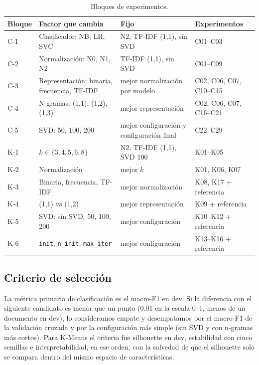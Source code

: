 \documentclass[11pt,a4paper]{article}
\newcommand{\code}[1]{\texttt{#1}}
\begin{document}
\begin{table}[htbp]
\centering
\footnotesize
\caption{Bloques de experimentos.}
\label{tab:bloques}
\begin{tabular}{@{}>{\raggedright\arraybackslash}p{1.2cm}>{\raggedright\arraybackslash}p{4.0cm}>{\raggedright\arraybackslash}p{3.8cm}>{\raggedright\arraybackslash}p{4.4cm}@{}}
\toprule
Bloque & Factor que cambia & Fijo & Experimentos\\
\midrule
C-1 & Clasificador: NB, LR, SVC & N2, TF-IDF (1,1), sin SVD & C01--C03\\
C-2 & Normalización: N0, N1, N2 & TF-IDF (1,1), sin SVD & C01--C09\\
C-3 & Representación: binaria, frecuencia, TF-IDF & mejor normalización por modelo & C02, C06, C07, C10--C15\\
C-4 & N-gramas: (1,1), (1,2), (1,3) & mejor representación & C02, C06, C07, C16--C21\\
C-5 & SVD: 50, 100, 200 & mejor configuración y configuración final & C22--C29\\
\midrule
K-1 & $k \in \{3,4,5,6,8\}$ & N2, TF-IDF (1,1), SVD 100 & K01--K05\\
K-2 & Normalización & mejor $k$ & K01, K06, K07\\
K-3 & Binaria, frecuencia, TF-IDF & mejor normalización & K08, K17 + referencia\\
K-4 & (1,1) vs (1,2) & mejor representación & K09 + referencia\\
K-5 & SVD: sin SVD, 50, 100, 200 & mejor configuración & K10--K12 + referencia\\
K-6 & \code{init}, \code{n\_init}, \code{max\_iter} & mejor configuración & K13--K16 + referencia\\
\bottomrule
\end{tabular}
\end{table}

\subsection{Criterio de selección}
La métrica primaria de clasificación es el macro-F1 en dev. Si la diferencia con el
siguiente candidato es menor que un punto (0.01 en la escala 0--1, menos de un documento
en dev), lo consideramos empate y desempatamos por el macro-F1 de la validación cruzada y por
la configuración más simple (sin SVD y con n-gramas más cortos). Para K-Means el criterio
fue silhouette en dev, estabilidad con cinco semillas e interpretabilidad, en ese orden,
con la salvedad de que el silhouette solo se compara dentro del mismo espacio de
características.
\end{document}
